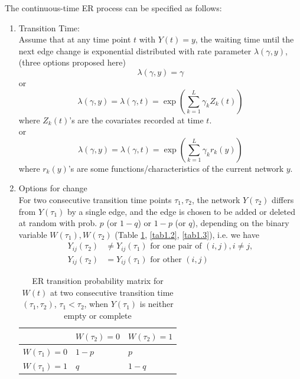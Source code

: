 \documentclass[10pt,letterpaper]{article}
\numberwithin{table}{section}
\numberwithin{figure}{section}
\numberwithin{equation}{section}
\begin{document}
The continuous-time ER process can be specified as follows: 
\begin{enumerate}


\item Transition Time:\\
Assume that at any time point $t$ with $Y(t) = y$, the waiting time until the next edge change is exponential distributed with rate parameter $ \lambda (\gamma, y)$, (three options proposed here) 
\begin{equation}
 \lambda (\gamma, y) = \gamma 
\end{equation}
or
\begin{equation}
 \lambda (\gamma, y) =  \lambda (\gamma, t) = \exp (\sum_{k=1}^L \gamma_k Z_k(t)) 
\end{equation}
where $Z_k(t)$'s are the covariates recorded at time $t$. \\
or 
\begin{equation}
 \lambda (\gamma, y) =  \lambda (\gamma, t) = \exp (\sum_{k=1}^L \gamma_k r_k(y)) 
\end{equation}
where $r_k(y)$'s are some functions/characteristics of the current network $y$. 

\item Options for change \\
For two consecutive transition time points $\tau_1, \tau_2$, the network $Y(\tau_2)$ differs from $Y(\tau_1)$ by a single edge, and the edge is chosen to be added or deleted at random with prob. $p$ (or $1-q$) or $1-p$ (or $q$), depending on the binary variable $W(\tau_1), W(\tau_2)$ (Table \ref{tab1.1}, \ref{tab1.2}, \ref{tab1.3}), i.e. we have 
\begin{equation}
\begin{split}
Y_{ij}(\tau_2) &\neq Y_{ij}(\tau_1) \text{ for one pair of } (i, j), i \neq j, \\
Y_{ij}(\tau_2) &= Y_{ij}(\tau_1)  \text{ for other } (i, j)
\end{split}
\end{equation}

\begin{table}[H]
\centering
\begin{tabular}{lll}
\hline
 &  $W(\tau_2)=0$&  $W(\tau_2)=1$\\\hline
$W(\tau_1)=0$ &  $1-p$ &  $p$\\
$W(\tau_1)=1$ &  $q$ & $1-q$\\\hline
\end{tabular}
\caption{ER transition probability matrix for $W(t)$ at two consecutive transition time $(\tau_1, \tau_2)$, $\tau_1 < \tau_2$, when $Y(\tau_1)$ is neither empty or complete}
\label{tab1.1}
\end{table}


\end{enumerate}
\end{document}
